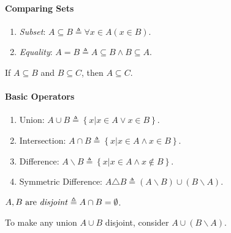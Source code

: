 \documentclass[10pt,twoside,twocolumn]{article}
\begin{document}
\paragraph{Comparing Sets}
\begin{enumerate}
\item \emph{Subset}: $A\subseteq B\triangleq\forall x\in A\left(x\in B\right)$.
\item \emph{Equality}: $A=B\triangleq A\subseteq B\land B\subseteq A$.
\end{enumerate}
If $A\subseteq B$ and $B\subseteq C$, then $A\subseteq C$.


\paragraph{Basic Operators}
\begin{enumerate}
\item Union: $A\cup B\triangleq\left\{ x|x\in A\lor x\in B\right\} $.
\item Intersection: $A\cap B\triangleq\left\{ x|x\in A\land x\in B\right\} $.
\item Difference: $A\backslash B\triangleq\left\{ x|x\in A\land x\notin B\right\} $.
\item Symmetric Difference: $A\triangle B\triangleq\left(A\backslash B\right)\cup\left(B\backslash A\right)$.
\end{enumerate}
$A,B\mbox{ are \emph{disjoint}}\triangleq A\cap B=\emptyset$.

To make any union $A\cup B$ disjoint, consider $A\cup\left(B\backslash A\right)$.
\end{document}
